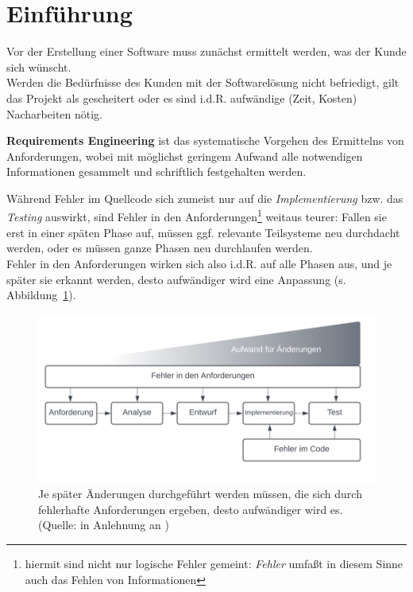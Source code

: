 \section{Einführung}

\noindent
Vor der Erstellung einer Software muss zunächst ermittelt werden, was der Kunde sich wünscht.\\
Werden die Bedürfnisse des Kunden mit der Softwarelösung nicht befriedigt, gilt das Projekt als gescheitert oder es sind i.d.R. aufwändige (Zeit, Kosten) Nacharbeiten nötig.\\

\vspace{5mm}
\begin{tcolorbox}
    \textbf{Requirements Engineering} ist das systematische Vorgehen des Ermittelns von Anforderungen,
    wobei mit möglichst geringem Aufwand alle notwendigen Informationen gesammelt und schriftlich festgehalten werden.
\end{tcolorbox}
\vspace{5mm}

\noindent
Während Fehler im Quellcode sich zumeist nur auf die \textit{Implementierung} bzw. das \textit{Testing} auswirkt, sind Fehler in den Anforderungen\footnote{
hiermit sind nicht nur logische Fehler gemeint: \textit{Fehler} umfaßt in diesem Sinne auch das Fehlen von Informationen
} weitaus teurer: Fallen sie erst in einer späten Phase auf, müssen ggf. relevante Teilsysteme neu durchdacht werden, oder es müssen ganze Phasen neu durchlaufen werden.\\
Fehler in den Anforderungen wirken sich also i.d.R. auf alle Phasen aus, und je später sie erkannt werden, desto aufwändiger wird eine Anpassung (s. Abbildung~\ref{fig:aufwand}).

\begin{figure}
    \centering
    \includegraphics[scale=0.4]{chapters/Requirements Engineering/img/aufwand}
    \caption{Je später Änderungen durchgeführt werden müssen, die sich durch fehlerhafte Anforderungen ergeben, desto aufwändiger wird es. (Quelle: in Anlehnung an \cite[38 f., Abb. 4.1 und 4.2]{Wed09})}
    \label{fig:aufwand}
\end{figure}


